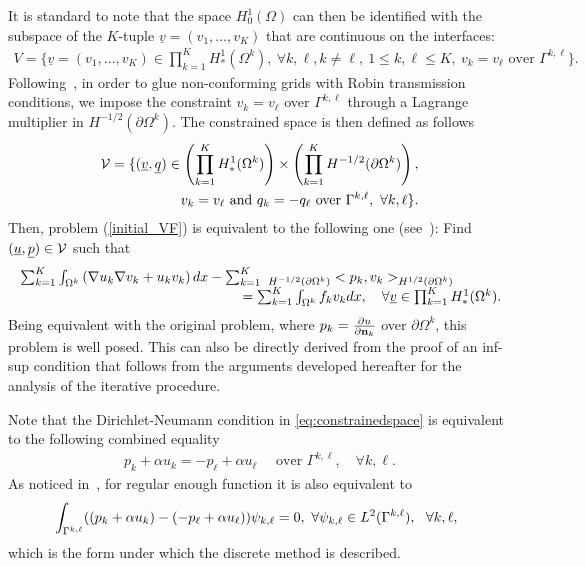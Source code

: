 \documentclass[final]{siamltex}
\begin{document}
It is standard
to note that the space $H^1_0(\Omega)$ can then be identified with the
subspace of the $K$-tuple ${{\underline v}}=(v_1,...,v_K)$ that are continuous on
the interfaces:
\begin{eqnarray}
V = \{{{\underline v}}=(v_1,...,v_K) \in \prod_{k=1}^K H^1_*(\Omega^k),  \
\forall k,\ell, k \ne \ell, \ 1 \le k,\ell \le K, \ v_k = v_{\ell}
\mbox{ over }
\Gamma^{k,\ell} \}.
\nonumber
\end{eqnarray}
Following~\cite{JMN10}, in order to glue non-conforming grids with Robin transmission
conditions, we impose the constraint $ v_k = v_{\ell}$ over 
$\Gamma^{k,\ell}$
through a Lagrange multiplier in $H^{-1/2}(\partial\Omega^k)$.
The constrained space is then defined as follows
\begin{eqnarray}\label{eq:constrainedspace}
    {\cal V} = {\displaystyle}\lbrace({{\underline v}},{{\underline q}})\in
\left(\prod_{k=1}^K H^1_*(\Omega^k)\right)\times \left(\prod_{k=1}^K
H^{-1/2}(\partial\Omega^k)\right), \nonumber\\
\ v_k=v_\ell\hbox{
  and }q_k = - q_\ell \hbox{ over }\Gamma^{k,\ell}, \ \forall k,\ell\rbrace.
\end{eqnarray}
Then, problem (\ref{initial_VF}) is equivalent to the following one (see~\cite{JMN10}):
Find $({{\underline u}},{{\underline p}}) \in {\cal V}$ such that
\begin{eqnarray*}
\label{eq:constraintpb}
\begin{array}{r}
{\displaystyle}\sum_{k=1}^{K} \int_{\Omega^k} \left( \nabla u_k\nabla v_k +u_kv_k \right) dx
- \sum_{k=1}^{ K}  \
_{H^{-1/2}(\partial\Omega^k)}<p_k,v_k>_{H^{1/2}(\partial\Omega^k)}\hspace{1.2cm}\\
{\displaystyle}= \sum_{k=1}^{K} \int_{\Omega^k} f_kv_kdx, \quad \forall {{\underline v}} \in
\prod_{k=1}^KH^1_*(\Omega^k).
\end{array}
\end{eqnarray*}
Being equivalent with the original problem, where $p_k = {\partial
  u\over\partial {{\bf n}}_k}$ over $\partial\Omega^k$, this problem is well
posed. This can also be directly derived from the proof of an inf-sup
condition that follows from the arguments developed hereafter for the
analysis of the iterative procedure.

Note that the Dirichlet-Neumann condition in \eqref{eq:constrainedspace}
is equivalent to the following combined equality
\begin{eqnarray}\label{eq:Robincd}
 p_k + \alpha u_k = - p_{\ell} + \alpha u_{\ell} \quad \mbox{ over }
\Gamma^{k,\ell}, \quad \forall k,\ell.
\end{eqnarray}
As noticed in~\cite{JMN10}, for regular enough function
it is also equivalent to 
\begin{eqnarray}\label{eq:Robincdint}
\hspace{-1cm}
\ \qquad\int_{\Gamma^{k,\ell}}((p_{k}+\alpha u_{k})-(-p_{\ell}+\alpha
u_{\ell})
)\psi_{k,\ell}
= 0,\
\forall \psi_{k,\ell} \in L^2(\Gamma^{k,\ell}), \ \  \forall k,\ell,
\end{eqnarray}
which is the form under which the discrete method is described.
\end{document}

